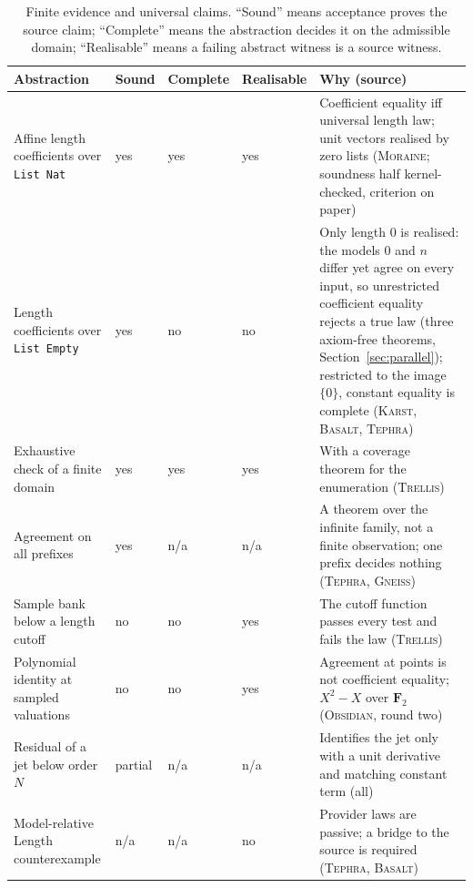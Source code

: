 \documentclass[11pt,a4paper]{article}
\newcommand{\code}[1]{\nolinkurl{#1}}
\newcommand{\Bs}{\textsc{Basalt}}
\newcommand{\Gn}{\textsc{Gneiss}}
\newcommand{\Ks}{\textsc{Karst}}
\newcommand{\Mr}{\textsc{Moraine}}
\newcommand{\Ob}{\textsc{Obsidian}}
\newcommand{\Tp}{\textsc{Tephra}}
\newcommand{\Tr}{\textsc{Trellis}}
\theoremstyle{definition}
\begin{document}
\begin{table}[htbp]
\centering\small
\caption{Finite evidence and universal claims. ``Sound'' means acceptance proves the source claim; ``Complete'' means the abstraction decides it on the admissible domain; ``Realisable'' means a failing abstract witness is a source witness.}
\label{tab:completeness}
\begin{tabularx}{\textwidth}{@{}L{40mm}L{12mm}L{16mm}L{16mm}Y@{}}
\toprule
Abstraction & Sound & Complete & Realisable & Why (source)\\
\midrule
Affine length coefficients over \code{List Nat} & yes & yes & yes & Coefficient equality iff universal length law; unit vectors realised by zero lists (\Mr; soundness half kernel-checked, criterion on paper)\\
Length coefficients over \code{List Empty} & yes & no & no & Only length $0$ is realised: the models $0$ and $n$ differ yet agree on every input, so unrestricted coefficient equality rejects a true law (three axiom-free theorems, Section~\ref{sec:parallel}); restricted to the image $\{0\}$, constant equality is complete (\Ks, \Bs, \Tp)\\
Exhaustive check of a finite domain & yes & yes & yes & With a coverage theorem for the enumeration (\Tr)\\
Agreement on all prefixes & yes & n/a & n/a & A theorem over the infinite family, not a finite observation; one prefix decides nothing (\Tp, \Gn)\\
Sample bank below a length cutoff & no & no & yes & The cutoff function passes every test and fails the law (\Tr)\\
Polynomial identity at sampled valuations & no & no & yes & Agreement at points is not coefficient equality; $X^2-X$ over $\mathbf F_2$ (\Ob, round two)\\
Residual of a jet below order $N$ & partial & n/a & n/a & Identifies the jet only with a unit derivative and matching constant term (all)\\
Model-relative Length counterexample & n/a & n/a & no & Provider laws are passive; a bridge to the source is required (\Tp, \Bs)\\
\bottomrule
\end{tabularx}
\end{table}
\end{document}
